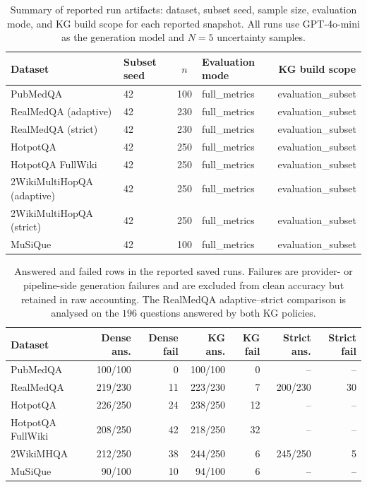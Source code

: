 \begin{table}[t]
\centering
\small
\caption{Summary of reported run artifacts: dataset, subset seed, sample size,
evaluation mode, and KG build scope for each reported snapshot.
All runs use GPT-4o-mini as the generation model and $N=5$ uncertainty samples.
\label{tab:run_artifacts}}
\begin{tabular}{@{}llcp{4.0cm}c@{}}
\toprule
Dataset & Subset seed & $n$ & Evaluation mode & KG build scope \\
\midrule
PubMedQA           & 42 & 100 & full\_metrics & evaluation\_subset \\
RealMedQA (adaptive) & 42 & 230 & full\_metrics & evaluation\_subset \\
RealMedQA (strict)   & 42 & 230 & full\_metrics & evaluation\_subset \\
HotpotQA           & 42 & 250 & full\_metrics & evaluation\_subset \\
HotpotQA FullWiki  & 42 & 250 & full\_metrics & evaluation\_subset \\
2WikiMultiHopQA (adaptive) & 42 & 250 & full\_metrics & evaluation\_subset \\
2WikiMultiHopQA (strict)   & 42 & 250 & full\_metrics & evaluation\_subset \\
MuSiQue            & 42 & 100 & full\_metrics & evaluation\_subset \\
\bottomrule
\end{tabular}
\end{table}

\begin{table}[t]
\centering
\small
\caption{Answered and failed rows in the reported saved runs.
Failures are provider- or pipeline-side generation failures and are excluded
from clean accuracy but retained in raw accounting.
The RealMedQA adaptive--strict comparison is analysed on the $196$ questions
answered by both KG policies.
\label{tab:generation_failures}}
\setlength{\tabcolsep}{4.5pt}
\begin{tabular}{@{}lrrrrrr@{}}
\toprule
Dataset & Dense ans. & Dense fail & KG ans. & KG fail & Strict ans. & Strict fail \\
\midrule
PubMedQA & 100/100 & 0 & 100/100 & 0 & -- & -- \\
RealMedQA & 219/230 & 11 & 223/230 & 7 & 200/230 & 30 \\
HotpotQA & 226/250 & 24 & 238/250 & 12 & -- & -- \\
HotpotQA FullWiki & 208/250 & 42 & 218/250 & 32 & -- & -- \\
2WikiMHQA & 212/250 & 38 & 244/250 & 6 & 245/250 & 5 \\
MuSiQue & 90/100 & 10 & 94/100 & 6 & -- & -- \\
\bottomrule
\end{tabular}
\end{table}

